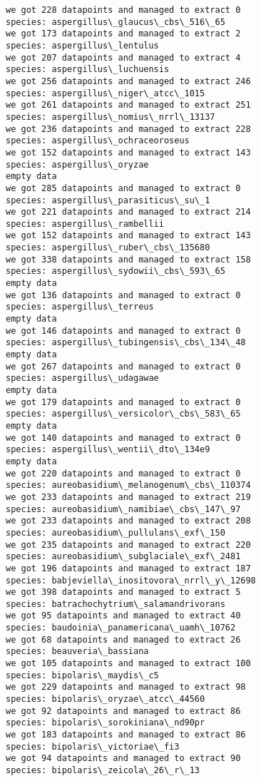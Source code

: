 \documentclass[11pt]{article}
\begin{document}
\begin{Verbatim}[commandchars=\\\{\}]
we got 228 datapoints and managed to extract 0
species: aspergillus\_glaucus\_cbs\_516\_65
we got 173 datapoints and managed to extract 2
species: aspergillus\_lentulus
we got 207 datapoints and managed to extract 4
species: aspergillus\_luchuensis
we got 256 datapoints and managed to extract 246
species: aspergillus\_niger\_atcc\_1015
we got 261 datapoints and managed to extract 251
species: aspergillus\_nomius\_nrrl\_13137
we got 236 datapoints and managed to extract 228
species: aspergillus\_ochraceoroseus
we got 152 datapoints and managed to extract 143
species: aspergillus\_oryzae
empty data
we got 285 datapoints and managed to extract 0
species: aspergillus\_parasiticus\_su\_1
we got 221 datapoints and managed to extract 214
species: aspergillus\_rambellii
we got 152 datapoints and managed to extract 143
species: aspergillus\_ruber\_cbs\_135680
we got 338 datapoints and managed to extract 158
species: aspergillus\_sydowii\_cbs\_593\_65
empty data
we got 136 datapoints and managed to extract 0
species: aspergillus\_terreus
empty data
we got 146 datapoints and managed to extract 0
species: aspergillus\_tubingensis\_cbs\_134\_48
empty data
we got 267 datapoints and managed to extract 0
species: aspergillus\_udagawae
empty data
we got 179 datapoints and managed to extract 0
species: aspergillus\_versicolor\_cbs\_583\_65
empty data
we got 140 datapoints and managed to extract 0
species: aspergillus\_wentii\_dto\_134e9
empty data
we got 220 datapoints and managed to extract 0
species: aureobasidium\_melanogenum\_cbs\_110374
we got 233 datapoints and managed to extract 219
species: aureobasidium\_namibiae\_cbs\_147\_97
we got 233 datapoints and managed to extract 208
species: aureobasidium\_pullulans\_exf\_150
we got 235 datapoints and managed to extract 220
species: aureobasidium\_subglaciale\_exf\_2481
we got 196 datapoints and managed to extract 187
species: babjeviella\_inositovora\_nrrl\_y\_12698
we got 398 datapoints and managed to extract 5
species: batrachochytrium\_salamandrivorans
we got 95 datapoints and managed to extract 40
species: baudoinia\_panamericana\_uamh\_10762
we got 68 datapoints and managed to extract 26
species: beauveria\_bassiana
we got 105 datapoints and managed to extract 100
species: bipolaris\_maydis\_c5
we got 229 datapoints and managed to extract 98
species: bipolaris\_oryzae\_atcc\_44560
we got 92 datapoints and managed to extract 86
species: bipolaris\_sorokiniana\_nd90pr
we got 183 datapoints and managed to extract 86
species: bipolaris\_victoriae\_fi3
we got 94 datapoints and managed to extract 90
species: bipolaris\_zeicola\_26\_r\_13

\end{Verbatim}
\end{document}
